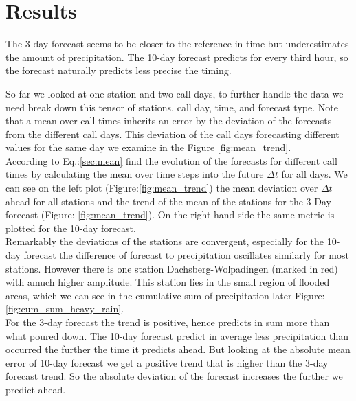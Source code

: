 \documentclass{article}
\theoremstyle{plain}
\theoremstyle{definition}
\theoremstyle{remark}
\begin{document}
\section{Results}\label{sec:results}


The 3-day forecast seems to be closer to the reference in time but
underestimates the amount of precipitation.
The 10-day forecast predicts for every third hour, so the forecast naturally
predicts less precise the timing.

So far we looked at one station and two call days, to further handle the data
we need break down this tensor of stations, call day, time, and forecast type.
Note that a mean over call times inherits an error by the deviation of the
forecasts from the different call days. This deviation of the call days
forecasting different values for the same day we examine in the Figure
\ref{fig:mean_trend}. \\
%  

According to Eq.:\ref{sec:mean} find the evolution of the forecasts for
different call times by calculating the mean over time steps into the future
$\Delta t$ for all days. We can see on the left plot
(Figure:\ref{fig:mean_trend}) the mean deviation over $\Delta t$ ahead for all
stations and the trend of the mean of the stations for the 3-Day forecast
(Figure: \ref{fig:mean_trend}). On the right hand side the same metric is
plotted for the 10-day forecast. \\
Remarkably the deviations of the stations are convergent, especially for the
10-day forecast the difference of forecast to precipitation oscillates
similarly for most stations. However there is one station Dachsberg-Wolpadingen
(marked in red) with amuch higher amplitude. This station lies in the small
region of flooded areas, which we can see in the cumulative sum of
precipitation later Figure:\ref{fig:cum_sum_heavy_rain}. \\

For the 3-day forecast the trend is positive, hence predicts in sum more than
what poured down. The 10-day forecast predict in average less precipitation
than occurred the further the time it predicts ahead. But looking at the
absolute mean error of 10-day forecast we get a positive trend that is higher
than the 3-day forecast trend. So the absolute deviation of the forecast
increases the further we predict ahead.\\
\end{document}
